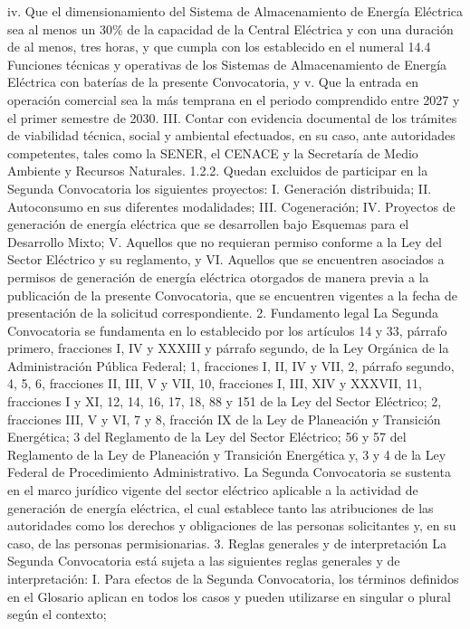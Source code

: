 iv. Que el dimensionamiento del Sistema de Almacenamiento de Energía Eléctrica sea al menos un 30\% de la capacidad de la Central Eléctrica y con una duración de al menos, tres horas, y que cumpla con los establecido en el numeral 14.4 Funciones técnicas y operativas de los Sistemas de Almacenamiento de Energía Eléctrica con baterías de la presente Convocatoria, y
v. Que la entrada en operación comercial sea la más temprana en el periodo comprendido entre 2027 y el primer semestre de 2030.
III. Contar con evidencia documental de los trámites de viabilidad técnica, social y ambiental efectuados, en su caso, ante autoridades competentes, tales como la SENER, el CENACE y la Secretaría de Medio Ambiente y Recursos Naturales.
1.2.2. Quedan excluidos de participar en la Segunda Convocatoria los siguientes proyectos:
I. Generación distribuida;
II. Autoconsumo en sus diferentes modalidades;
III. Cogeneración;
IV. Proyectos de generación de energía eléctrica que se desarrollen bajo Esquemas para el Desarrollo Mixto;
V. Aquellos que no requieran permiso conforme a la Ley del Sector Eléctrico y su reglamento, y
VI. Aquellos que se encuentren asociados a permisos de generación de energía eléctrica otorgados de manera previa a la publicación de la presente Convocatoria, que se encuentren vigentes a la fecha de presentación de la solicitud correspondiente.
2. Fundamento legal
La Segunda Convocatoria se fundamenta en lo establecido por los artículos 14 y 33, párrafo primero, fracciones I, IV y XXXIII y párrafo segundo, de la Ley Orgánica de la Administración Pública Federal; 1, fracciones I, II, IV y VII, 2, párrafo segundo, 4, 5, 6, fracciones II, III, V y VII, 10, fracciones I, III, XIV y XXXVII, 11, fracciones I y XI, 12, 14, 16, 17, 18, 88 y 151 de la Ley del Sector Eléctrico; 2, fracciones III, V y VI, 7 y 8, fracción IX de la Ley de Planeación y Transición Energética; 3 del Reglamento de la Ley del Sector Eléctrico; 56 y 57 del Reglamento de la Ley de Planeación y Transición Energética y, 3 y 4 de la Ley Federal de Procedimiento Administrativo.
La Segunda Convocatoria se sustenta en el marco jurídico vigente del sector eléctrico aplicable a la actividad de generación de energía eléctrica, el cual establece tanto las atribuciones de las autoridades como los derechos y obligaciones de las personas solicitantes y, en su caso, de las personas permisionarias.
3. Reglas generales y de interpretación
La Segunda Convocatoria está sujeta a las siguientes reglas generales y de interpretación:
I. Para efectos de la Segunda Convocatoria, los términos definidos en el Glosario aplican en todos los casos y pueden utilizarse en singular o plural según el contexto;
